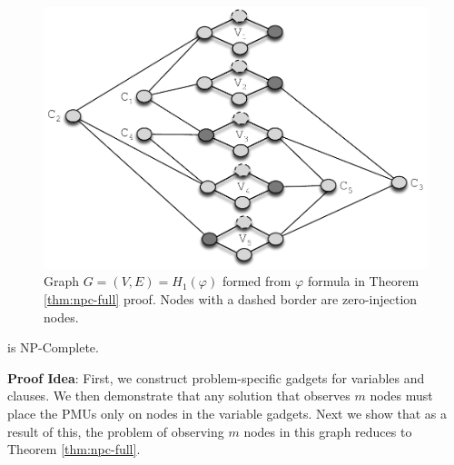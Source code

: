 \begin{figure}[t]
\centering
\includegraphics[scale=0.53]{figs/proof1-inject-example.pdf}
\caption{Graph $G=(V,E)=H_1(\varphi)$ formed from $\varphi$ formula in Theorem \ref{thm:npc-full} proof. Nodes with a dashed border are zero-injection nodes.}
\label{fig:proof1-inject-example}
\end{figure}

\begin{theorem}
\maxinc is NP-Complete. %
\label{thm:npc-maxinc}
\end{theorem}

{\bf Proof Idea}: First, we construct problem-specific gadgets for variables and clauses. We then demonstrate that any solution that observes $m$ nodes must place the PMUs only on nodes
in the variable gadgets. Next we show that as a result of this, the problem of observing $m$ nodes in this graph reduces to Theorem \ref{thm:npc-full}.

